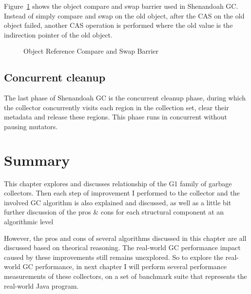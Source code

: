 Figure~\ref{fig:objectcasbarrier} shows the object compare and swap barrier used in Shenandoah GC.
Instead of simply compare and swap on the old object, after the CAS on the old object failed,
another CAS operation is performed where the old value is the indirection pointer of the old object.

\begin{figure}
  \centering
  
  \caption{Object Reference Compare and Swap Barrier} 
  \label{fig:objectcasbarrier}
\end{figure}

\subsection{Concurrent cleanup}

The last phase of Shenandoah GC is the concurrent cleanup phase, during which the
collector concurrently visits each region in the collection set, clear their metadata
and release these regions. This phase runs in concurrent without pausing mutators.



\section{Summary}

This chapter explores and discusses relationship of the G1 family of garbage collectors.
Then each step of improvement I performed to the collector and the involved GC algorithm
is also explained and discussed, as well as a little bit further discussion of the
pros \& cons for each structural component at an algorithmic level

However, the pros and cons of several algorithms discussed in this chapter are
all discussed based on theorical reasoning.
The real-world GC performance impact caused by these improvements still remains unexplored.
So to explore the real-world GC performance, in next chapter I will perform several performance
measurements of these collectors, on a set of banchmark suite that represents the
real-world Java program.


